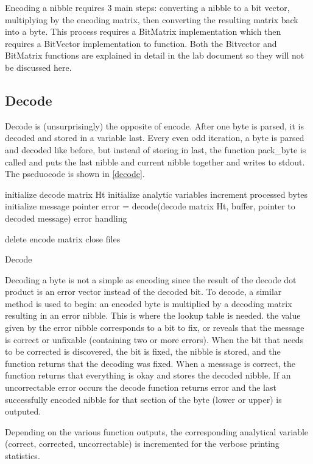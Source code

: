 \documentclass[12pt]{article}
\begin{document}
Encoding a nibble requires 3 main steps: converting a nibble to a bit
vector, multiplying by the encoding matrix, then converting the resulting
matrix back into a byte. This process requires a BitMatrix implementation which then 
requires a BitVector implementation to function.
Both the Bitvector and BitMatrix functions are explained in detail in the lab document
so they will not be discussed here.

\subsection{Decode}

Decode is (unsurprisingly) the opposite of encode. After one byte is
parsed, it is decoded and stored in a variable last.
Every even odd iteration, a byte is parsed and decoded like before,
but instead of storing in last, the function pack\_byte is called
and puts the last nibble and current nibble together and writes to
stdout.
The pseduocode is shown in \vref{decode}.

\begin{algorithm}
    initialize decode matrix Ht\;
    initialize analytic variables\;
     {
        increment processed bytes\;
        initialize message pointer\;
        error = decode(decode matrix Ht, buffer, pointer to decoded message)\;
		error handling\;
        \vspace{0.4em}
    }

    delete encode matrix\;
    close files\;
    \caption{Decode}\label{decode}
\end{algorithm}

Decoding a byte is not a simple as encoding since the result of the decode
dot product is an error vector instead of the decoded bit. To decode, a similar
method is used to begin: an encoded byte is multiplied by a decoding matrix
resulting in an error nibble.
This is where the lookup table is needed.
the value given by the error nibble corresponds to a bit to fix, or reveals that
the message is correct or unfixable (containing two or more errors).
When the bit that needs to be corrected is discovered, the bit is fixed, the nibble is stored,  and the function
returns that the decoding was fixed.
When a messsage is correct, the function returns that everything is okay and stores the decoded nibble.
If an uncorrectable error occurs the decode function returns error and the last successfully
encoded nibble for that section of the byte (lower or upper) is outputed.

Depending on the various function outputs, the corresponding analytical variable (correct, corrected,
uncorrectable) is incremented for the verbose printing statistics.
\end{document}
